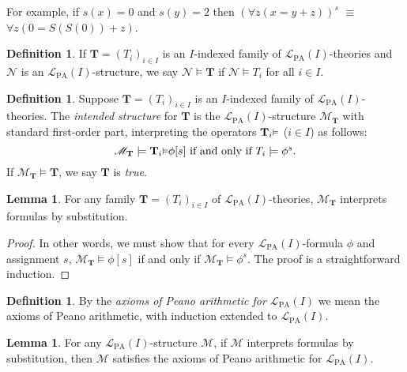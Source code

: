 \documentclass[reqno]{article}
\theoremstyle{definition}
\newtheorem{lemma}[theorem]{Lemma}
\newtheorem{definition}[theorem]{Definition}
\def\L{\mathscr{L}}
\def\M{\mathscr{M}}
\def\T{\mathbf{T}}
\def\LPA{\L_{\mathrm{PA}}}
\renewcommand{\Pr}[1]{\T_{#1}\mbox{\small${\vDash}$}}
\begin{document}
For example, if $s(x)=0$ and $s(y)=2$
then $(\forall z(x=y+z))^s$ ${\equiv}$ $\forall z(0=S(S(0))+z)$.


\begin{definition}
If $\T=(T_i)_{i\in I}$ is an $I$-indexed family of $\LPA(I)$-theories
and $\mathscr N$ is an $\LPA(I)$-structure, we say $\mathscr N\models\T$
if $\mathscr N\models T_i$ for all $i\in I$.
\end{definition}

\begin{definition}
\label{intendedstructdefn}
Suppose $\T=(T_i)_{i\in I}$ is an $I$-indexed family of 
$\LPA(I)$-theories.
The \emph{intended structure} for $\T$ is the $\LPA(I)$-structure $\M_\T$
with standard first-order part,
interpreting the operators $\Pr{i}$ ($i\in I$) as follows:
\[
\mbox{$\M_\T\models\Pr{i}\phi[s]$ if and only if $T_i\models\phi^s$.}
\]
If $\M_\T\models\T$, we say $\T$ is \emph{true}.
\end{definition}

\begin{lemma}
\label{howintendedworks}
For any family $\T=(T_i)_{i\in I}$ of $\LPA(I)$-theories,
$\M_\T$ interprets formulas by substitution.
\end{lemma}

\begin{proof}
In other words,
we must show that
for every $\LPA(I)$-formula $\phi$ and assignment $s$,
$\M_\T\models\phi[s]$ if and only if $\M_\T\models\phi^s$.
The proof is a straightforward induction.
\end{proof}

\begin{definition}
By the \emph{axioms of Peano arithmetic for $\LPA(I)$} we mean the axioms of Peano arithmetic,
with induction extended to $\LPA(I)$.
\end{definition}

\begin{lemma}
\label{extendedpalemma}
For any $\LPA(I)$-structure $\M$, if $\M$
interprets formulas by substitution,
then $\M$ satisfies the axioms of Peano arithmetic for $\LPA(I)$.
\end{lemma}
\end{document}
